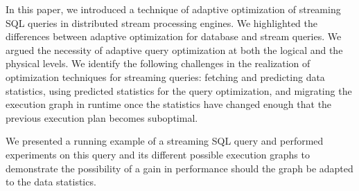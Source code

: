 \label {sec:fs-optimization-conclusion}
In this paper, we introduced a technique of adaptive optimization of streaming SQL queries in distributed stream processing engines. 
We highlighted the differences between adaptive optimization for database and stream queries. 
We argued the necessity of adaptive query optimization at both the logical and the physical levels.
We identify the following challenges in the realization of  optimization techniques for streaming queries: 
fetching and predicting data statistics, 
using predicted statistics for the query optimization, 
and migrating the execution graph in runtime once the statistics have changed enough that the previous execution plan becomes suboptimal. 

We presented a running example of a streaming SQL query and performed experiments on this query and its different possible execution graphs to demonstrate the possibility of a gain in performance should the graph be adapted to the data statistics. 

